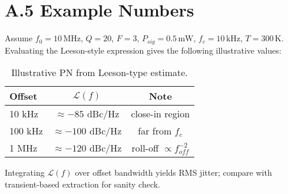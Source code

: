 \section*{A.5 Example Numbers}
Assume \(f_0=10\,\text{MHz}\), \(Q=20\), \(F=3\), \(P_{sig}=0.5\,\text{mW}\), \(f_c=10\,\text{kHz}\), \(T=300\,\text{K}\). Evaluating the Leeson-style expression gives the following illustrative values:
\begin{table}[H]
  \centering
  \begin{tabular}{lcc}
    \toprule
    Offset & $\mathcal{L}(f)$ & Note \\
    \midrule
    10 kHz & $\approx -85$ dBc/Hz & close-in region \\
    100 kHz & $\approx -100$ dBc/Hz & far from $f_c$ \\
    1 MHz & $\approx -120$ dBc/Hz & roll-off $\propto f_{off}^{-2}$ \\
    \bottomrule
  \end{tabular}
  \caption{Illustrative PN from Leeson-type estimate.}
\end{table}
Integrating \(\mathcal{L}(f)\) over offset bandwidth yields RMS jitter; compare with transient-based extraction for sanity check.


